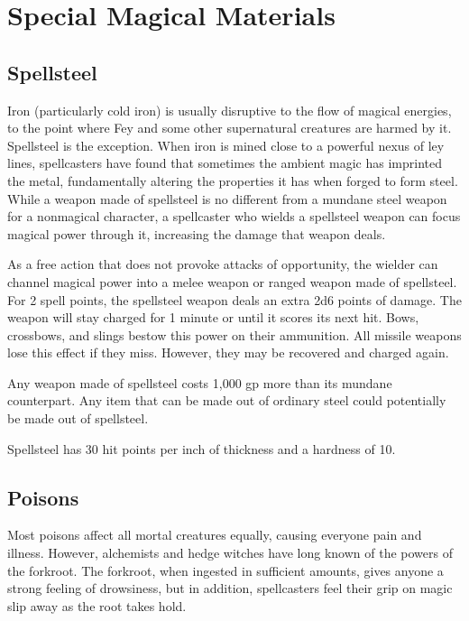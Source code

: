 \section{Special Magical Materials}
\subsection{Spellsteel}
Iron (particularly cold iron) is usually disruptive to the flow of magical energies, to the point where Fey and some other supernatural creatures are harmed by it. 
Spellsteel is the exception. 
When iron is mined close to a powerful nexus of ley lines, spellcasters have found that sometimes the ambient magic has imprinted the metal, fundamentally altering the properties it has when forged to form steel. While a weapon made of spellsteel is no different from a mundane steel weapon for a nonmagical character, a spellcaster who wields a spellsteel weapon can focus magical power through it, increasing the damage that weapon deals.
 
As a free action that does not provoke attacks of opportunity, the wielder can channel magical power into a melee weapon or ranged weapon made of spellsteel. For 2 spell points, the spellsteel weapon deals an extra 2d6 points of damage. The weapon will stay charged for 1 minute or until it scores its next hit. Bows, crossbows, and slings bestow this power on their ammunition. All missile weapons lose this effect if they miss. However, they may be recovered and charged again.

Any weapon made of spellsteel costs 1,000 gp more than its mundane counterpart. Any item that can be made out of ordinary steel could potentially be made out of spellsteel. 

Spellsteel has 30 hit points per inch of thickness and a hardness of 10. 
\subsection{Poisons}
Most poisons affect all mortal creatures equally, causing everyone pain and illness. However, alchemists and hedge witches have long known of the powers of the forkroot. The forkroot, when ingested in sufficient amounts, gives anyone a strong feeling of drowsiness, but in addition, spellcasters feel their grip on magic slip away as the root takes hold.


